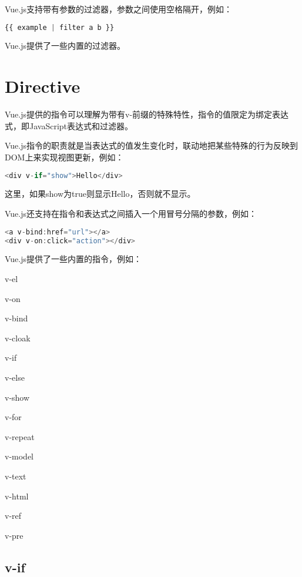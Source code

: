 Vue.js支持带有参数的过滤器，参数之间使用空格隔开，例如：


\begin{lstlisting}[language=JavaScript]
{{ example | filter a b }}
\end{lstlisting}

Vue.js提供了一些内置的过滤器。

\section{Directive}


Vue.js提供的指令可以理解为带有v-前缀的特殊特性，指令的值限定为绑定表达式，即JavaScript表达式和过滤器。

Vue.js指令的职责就是当表达式的值发生变化时，联动地把某些特殊的行为反映到DOM上来实现视图更新，例如：


\begin{lstlisting}[language=JavaScript]
<div v-if="show">Hello</div>
\end{lstlisting}


这里，如果show为true则显示Hello，否则就不显示。

Vue.js还支持在指令和表达式之间插入一个用冒号分隔的参数，例如：

\begin{lstlisting}[language=JavaScript]
<a v-bind:href="url"></a>
<div v-on:click="action"></div>
\end{lstlisting}

Vue.js提供了一些内置的指令，例如：

\begin{compactitem}
\item v-el
\item v-on
\item v-bind
\item v-cloak
\item v-if
\item v-else
\item v-show
\item v-for
\item v-repeat
\item v-model
\item v-text
\item v-html
\item v-ref
\item v-pre
\end{compactitem}

\subsection{v-if}


